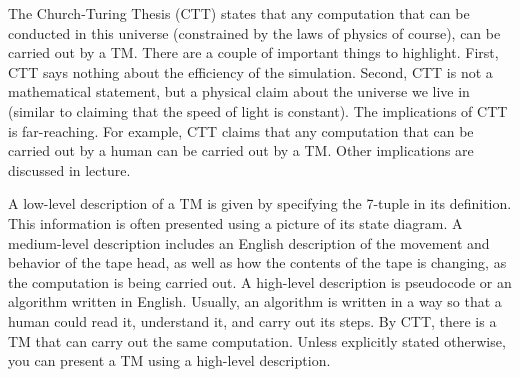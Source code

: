 \begin{important}
\label{important:The-Church-Turing-Thesis}
The Church-Turing Thesis (CTT) states that any computation that can be conducted in this universe (constrained by the laws of physics of course), can be carried out by a TM. There are a couple of important things to highlight. First, CTT says nothing about the efficiency of the simulation. Second, CTT is not a mathematical statement, but a physical claim about the universe we live in (similar to claiming that the speed of light is constant). The implications of CTT is far-reaching. For example, CTT claims that any computation that can be carried out by a human can be carried out by a TM. Other implications are discussed in lecture.

\end{important}

\begin{note}
\label{note:Low-level-medium-level-high-level-descriptions-of-TMs}
A low-level description of a TM is given by specifying the 7-tuple in its definition. This information is often presented using a picture of its state diagram. A medium-level description includes an English description of the movement and behavior of the tape head, as well as how the contents of the tape is changing, as the computation is being carried out. A high-level description is pseudocode or an algorithm written in English. Usually, an algorithm is written in a way so that a human could read it, understand it, and carry out its steps. By CTT, there is a TM that can carry out the same computation. Unless explicitly stated otherwise, you can present a TM using a high-level description.

\end{note}

